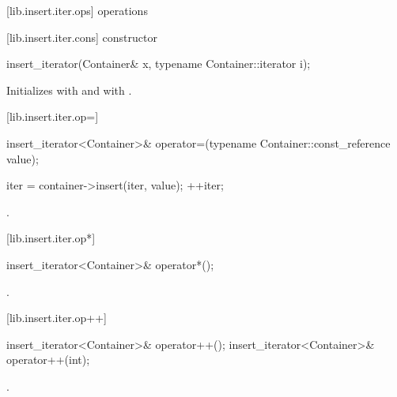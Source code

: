 [lib.insert.iter.ops]{ operations}

[lib.insert.iter.cons]{ constructor}

%
\begin{itemdecl}
insert_iterator(Container& x, typename Container::iterator i);
\end{itemdecl}

\begin{itemdescr}
\pnum
\effects
Initializes
with  and
with .
\end{itemdescr}

[lib.insert.iter.op=]{}

%
\begin{itemdecl}
insert_iterator<Container>&
  operator=(typename Container::const_reference value);
\end{itemdecl}

\begin{itemdescr}
\pnum
\effects
\begin{codeblock}
    iter = container->insert(iter, value);
    ++iter;
\end{codeblock}

\pnum
\returns
{}.
\end{itemdescr}

[lib.insert.iter.op*]{}

%
\begin{itemdecl}
insert_iterator<Container>& operator*();
\end{itemdecl}

\begin{itemdescr}
\pnum
\returns
{}.
\end{itemdescr}

[lib.insert.iter.op++]{}

%
\begin{itemdecl}
insert_iterator<Container>& operator++();
insert_iterator<Container>& operator++(int);
\end{itemdecl}

\begin{itemdescr}
\pnum
\returns
{}.
\end{itemdescr}

